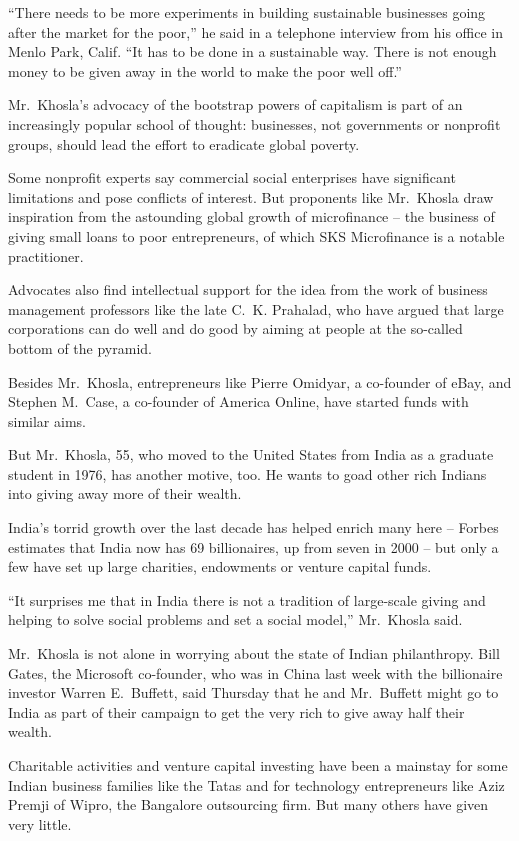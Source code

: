 ﻿\documentclass[12pt]{article}
\begin{document}
``There needs to be more experiments in building sustainable businesses going after the market for
the poor,'' he said in a telephone interview from his office in Menlo Park, Calif. ``It has to be
done in a sustainable way. There is not enough money to be given away in the world to make the poor
well off.''

Mr.~Khosla's advocacy of the bootstrap powers of capitalism is part of an increasingly popular
school of thought: businesses, not governments or nonprofit groups, should lead the effort to
eradicate global poverty.

Some nonprofit experts say commercial social enterprises have significant limitations and pose
conflicts of interest. But proponents like Mr.~Khosla draw inspiration from the astounding global
growth of microfinance -- the business of giving small loans to poor entrepreneurs, of which SKS
Microfinance is a notable practitioner.

Advocates also find intellectual support for the idea from the work of business management
professors like the late C.~K. Prahalad, who have argued that large corporations can do well and do
good by aiming at people at the so-called bottom of the pyramid.

Besides Mr.~Khosla, entrepreneurs like Pierre Omidyar, a co-founder of eBay, and Stephen M.~Case, a
co-founder of America Online, have started funds with similar aims.

But Mr.~Khosla, 55, who moved to the United States from India as a graduate student in 1976, has
another motive, too. He wants to goad other rich Indians into giving away more of their wealth.

India's torrid growth over the last decade has helped enrich many here -- Forbes estimates that
India now has 69 billionaires, up from seven in 2000 -- but only a few have set up large charities,
endowments or venture capital funds.

``It surprises me that in India there is not a tradition of large-scale giving and helping to solve
social problems and set a social model,'' Mr.~Khosla said.

Mr.~Khosla is not alone in worrying about the state of Indian philanthropy. Bill Gates, the
Microsoft co-founder, who was in China last week with the billionaire investor Warren E.~Buffett,
said Thursday that he and Mr.~Buffett might go to India as part of their campaign to get the very
rich to give away half their wealth.

Charitable activities and venture capital investing have been a mainstay for some Indian business
families like the Tatas and for technology entrepreneurs like Aziz Premji of Wipro, the Bangalore
outsourcing firm. But many others have given very little.
\end{document}
